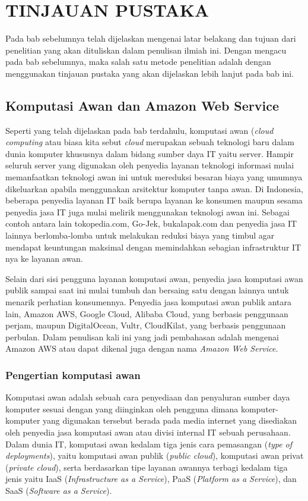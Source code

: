 \documentclass[pi.tex]{subfile}
\begin{document}
\chapter{TINJAUAN PUSTAKA}

Pada bab sebelumnya telah dijelaskan mengenai latar belakang dan tujuan dari penelitian yang akan dituliskan dalam penulisan ilmiah ini. Dengan mengacu pada bab sebelumnya, maka salah satu metode penelitian adalah dengan menggunakan tinjauan pustaka yang akan dijelaskan lebih lanjut pada bab ini.

\section{Komputasi Awan dan Amazon Web Service}
Seperti yang telah dijelaskan pada bab terdahulu, komputasi awan (\emph{cloud computing} atau biasa kita sebut \emph{cloud}  merupakan sebuah teknologi baru dalam dunia komputer khususnya dalam bidang sumber daya IT yaitu server. Hampir seluruh server yang digunakan oleh penyedia layanan teknologi informasi mulai memanfaatkan teknologi awan ini untuk mereduksi besaran biaya yang umumnya dikeluarkan apabila menggunakan arsitektur komputer tanpa awan. Di Indonesia, beberapa penyedia layanan IT baik berupa layanan ke konsumen maupun sesama penyedia jasa IT juga mulai melirik menggunakan teknologi awan ini. Sebagai contoh antara lain tokopedia.com, Go-Jek, bukalapak.com dan penyedia jasa IT lainnya berlomba-lomba untuk melakukan reduksi biaya yang timbul agar mendapat keuntungan maksimal dengan memindahkan sebagian infrastruktur IT nya ke layanan awan.

Selain dari sisi pengguna layanan komputasi awan, penyedia jasa komputasi awan publik sampai saat ini mulai tumbuh dan bersaing satu dengan lainnya untuk menarik perhatian konsumennya. Penyedia jasa komputasi awan publik antara lain, Amazon AWS, Google Cloud, Alibaba Cloud, yang berbasis penggunaan perjam, maupun DigitalOcean, Vultr, CloudKilat, yang berbasis penggunaan perbulan. Dalam penulisan kali ini yang jadi pembahasan adalah mengenai Amazon AWS atau dapat dikenal juga dengan nama \emph{Amazon Web Service}.

\subsection{Pengertian komputasi awan}
Komputasi awan adalah sebuah cara penyediaan dan penyaluran sumber daya komputer sesuai dengan yang diinginkan oleh pengguna dimana komputer-komputer yang digunakan tersebut berada pada media internet yang disediakan oleh penyedia jasa komputasi awan atau divisi internal IT sebuah perusahaan. Dalam dunia IT, komputasi awan kedalam tiga jenis cara pemasangan (\emph{type of deployments}), yaitu komputasi awan publik (\emph{public cloud}), komputasi awan privat (\emph{private cloud}), serta berdasarkan tipe layanan awannya terbagi kedalam tiga jenis yaitu IaaS (\emph{Infrastructure as a Service}), PaaS (\emph{Platform as a Service}), dan SaaS (\emph{Software as a Service}).
\end{document}
